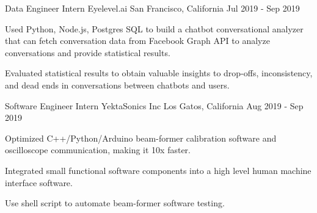

\begin{cventries}

  \cventry
    {Data Engineer Intern} %
    {Eyelevel.ai} %
    {San Francisco, California} %
    {Jul 2019 - Sep 2019} %
    {
	\begin{cvitems} %
      	\item Used Python, Node.js, Postgres SQL to build a chatbot conversational analyzer that can fetch conversation data from Facebook Graph API to analyze conversations and provide statistical results.
      	\item Evaluated statistical results to obtain valuable insights to drop-offs, inconsistency, and dead ends in conversations between chatbots and users.
	\end{cvitems}
    }
    
  \cventry
    {Software Engineer Intern} %
    {YektaSonics Inc} %
    {Los Gatos, California} %
    {Aug 2019 - Sep 2019} %
    {
	\begin{cvitems} %
      	\item Optimized C++/Python/Arduino beam-former calibration software and oscilloscope communication, making it 10x faster.
      	\item Integrated small functional software components into a high level human machine interface software. 
      	\item Use shell script to automate beam-former software testing.
	\end{cvitems}
    }
    

\end{cventries}

